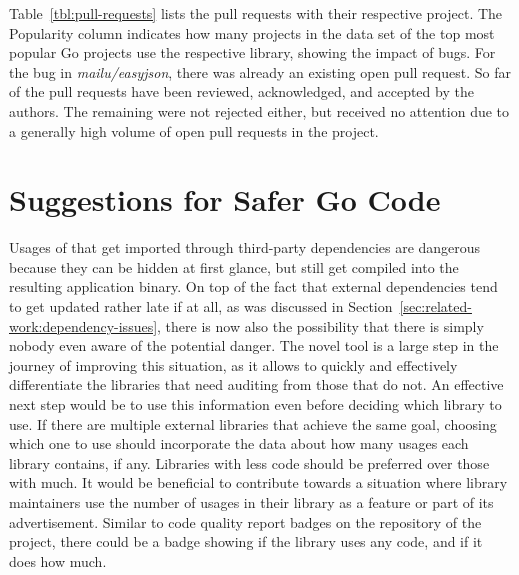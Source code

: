 

Table~\ref{tbl:pull-requests} lists the pull requests with their respective \github{} project.
The Popularity column indicates how many projects in the data set of the top \projsTotal{} most popular Go projects use
the respective library, showing the impact of bugs.
For the bug in \textit{mailu/easyjson}, there was already an existing open pull request.
So far \numberPRsMerged{} of the pull requests have been reviewed, acknowledged, and accepted by the authors.
The remaining were not rejected either, but received no attention due to a generally high volume of open pull requests
in the project.



\section{Suggestions for Safer Go Code}\label{sec:discussion:safer-go-code}

Usages of \unsafe{} that get imported through third-party dependencies are dangerous because they can be hidden at first
glance, but still get compiled into the resulting application binary.
On top of the fact that external dependencies tend to get updated rather late if at all, as was discussed in
Section~\ref{sec:related-work:dependency-issues}, there is now also the possibility that there is simply nobody even
aware of the potential danger.
The novel tool \toolGeiger{} is a large step in the journey of improving this situation, as it allows to quickly and
effectively differentiate the libraries that need auditing from those that do not.
An effective next step would be to use this information even before deciding which library to use.
If there are multiple external libraries that achieve the same goal, choosing which one to use should incorporate the
data about how many \unsafe{} usages each library contains, if any.
Libraries with less \unsafe{} code should be preferred over those with much.
It would be beneficial to contribute towards a situation where library maintainers use the number of \unsafe{} usages
in their library as a feature or part of its advertisement.
Similar to code quality report badges on the \github{} repository of the project, there could be a badge showing if the
library uses any \unsafe{} code, and if it does how much.

